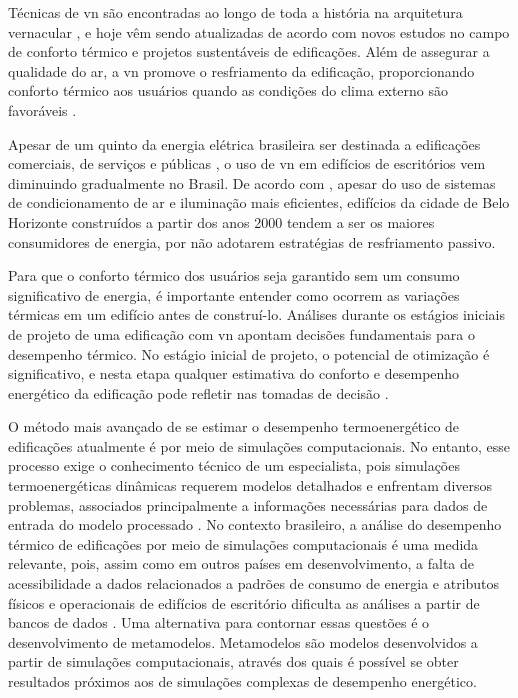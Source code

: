 \documentclass[brazil,hardcopy,openany]{ufscthesis} %
\begin{document}
Técnicas de \acrshort{vn} são encontradas ao longo de toda a história na arquitetura vernacular \cite{Pesic2018}, e hoje vêm sendo atualizadas de acordo com novos estudos no campo de conforto térmico e projetos sustentáveis de edificações.
Além de assegurar a qualidade do ar, a \acrshort{vn} promove o resfriamento da edificação, proporcionando conforto térmico aos usuários quando as condições do clima externo são favoráveis \cite{Yao2009}.

Apesar de um quinto da energia elétrica brasileira ser destinada a edificações comerciais, de serviços e públicas \cite{EPE2018}, o uso de \acrshort{vn} em edifícios de escritórios vem diminuindo gradualmente no Brasil. De acordo com , apesar do uso de sistemas de condicionamento de ar e iluminação mais eficientes, edifícios da cidade de Belo Horizonte construídos a partir dos anos 2000 tendem a ser os maiores consumidores de energia, por não adotarem estratégias de resfriamento passivo.

Para que o conforto térmico dos usuários seja garantido sem um consumo significativo de energia, é importante entender como ocorrem as variações térmicas em um edifício antes de construí-lo. Análises durante os estágios iniciais de projeto de uma edificação com \acrshort{vn} apontam decisões fundamentais para o desempenho térmico. No estágio inicial de projeto, o potencial de otimização é significativo, e nesta etapa qualquer estimativa do conforto e desempenho energético da edificação pode refletir nas tomadas de decisão \cite{Belleri2014, Roetzel2014}.

O método mais avançado de se estimar o desempenho termoenergético de edificações atualmente é por meio de simulações computacionais. No entanto, esse processo exige o conhecimento técnico de um especialista, pois simulações termoenergéticas dinâmicas requerem modelos detalhados e enfrentam diversos problemas, associados principalmente a informações necessárias para dados de entrada do modelo processado \cite{Corgnati2013}. No contexto brasileiro, a análise do desempenho térmico de edificações por meio de simulações computacionais é uma medida relevante, pois, assim como em outros países em desenvolvimento, a falta de acessibilidade a dados relacionados a padrões de consumo de energia e atributos físicos e operacionais de edifícios de escritório dificulta as análises a partir de bancos de dados \cite{Alves2018}. Uma alternativa para contornar essas questões é o desenvolvimento de metamodelos. Metamodelos são modelos desenvolvidos a partir de simulações computacionais, através dos quais é possível se obter resultados próximos aos de simulações complexas de desempenho energético.
\end{document}
